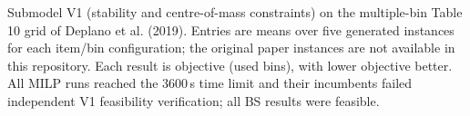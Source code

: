 
\providecommand{\up}{\rule{0pt}{2.6ex}}
\providecommand{\down}{\rule[-1.2ex]{0pt}{0pt}}

\begin{table}[htbp]
\centering
\caption{Submodel V1 (stability and centre-of-mass constraints) on the
multiple-bin Table 10 grid of Deplano et al. (2019). Entries are means over
five generated instances for each item/bin configuration; the original paper
instances are not available in this repository. Each result is objective
(used bins), with lower objective better. All MILP runs reached the 3600\,s
time limit and their incumbents failed independent V1 feasibility
verification; all BS results were feasible.}
\label{tab:results-table10-v1}

\end{table}

